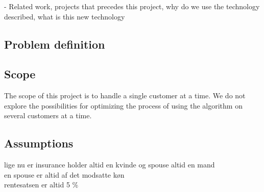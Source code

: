 - Related work, projects that precedes this project, why do we use the technology described, what is this new technology

\subsection{Problem definition}


\subsection{Scope}
	The scope of this project is to handle a single customer at a time. We do not explore the possibilities for optimizing the process of using the algorithm on several customers at a time.
	
	\subsection{Assumptions}
	lige nu er insurance holder altid en kvinde og spouse altid en mand \\
	en spouse er altid af det modsatte køn \\
	rentesatsen er altid 5 \% \\
